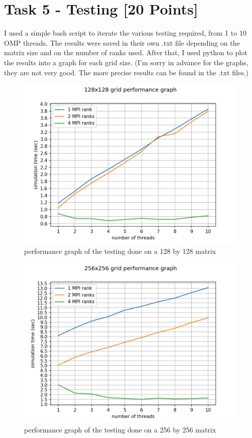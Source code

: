 \documentclass[unicode,11pt,a4paper,oneside,numbers=endperiod,openany]{scrartcl}
\begin{document}
\section{Task 5 - Testing [20 Points]}

I used a simple bash script to iterate the various testing required, from 1 to 10 OMP threads.
\newline
The results were saved in their own .txt file depending on the matrix size and on the number of ranks used.
\newline
After that, I used python to plot the results into a graph for each grid size. (I'm sorry in advance for the graphs, they are not very good. The more precise results can be found in the .txt files.)

\begin{figure}[H]
\centering
\includegraphics[width=0.9\linewidth]{128x128_plot.png}
\caption{performance graph of the testing done on a 128 by 128 matrix}
\end{figure}

\begin{figure}[H]
\centering
\includegraphics[width=0.9\linewidth]{256x256_plot.png}
\caption{performance graph of the testing done on a 256 by 256 matrix}
\end{figure}
\end{document}
